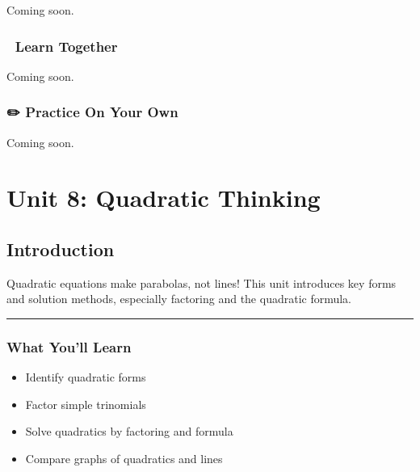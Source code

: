 \documentclass[
  letterpaper,
]{scrrept}
\providecommand{\tightlist}{%
  \setlength{\itemsep}{0pt}\setlength{\parskip}{0pt}}
\begin{document}

Coming soon.

\section*{🧠 Learn Together}\label{learn-together-35}


Coming soon.

\section*{✏️ Practice On Your Own}\label{practice-on-your-own-35}


Coming soon.

\part{Unit 8: Quadratic Thinking}

\chapter*{Introduction}\label{introduction-7}


Quadratic equations make parabolas, not lines! This unit introduces key
forms and solution methods, especially factoring and the quadratic
formula.

\begin{center}\rule{0.5\linewidth}{0.5pt}\end{center}

\section*{What You'll Learn}\label{what-youll-learn-6}


\begin{itemize}
\tightlist
\item
  Identify quadratic forms
\item
  Factor simple trinomials
\item
  Solve quadratics by factoring and formula
\item
  Compare graphs of quadratics and lines
\end{itemize}
\end{document}
